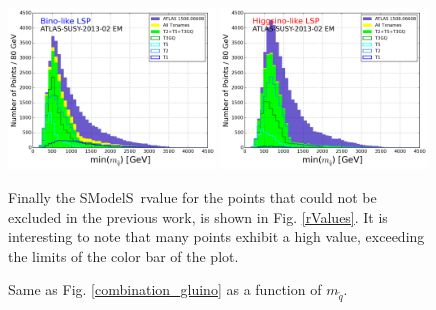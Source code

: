 \documentclass[a4paper,11pt]{article}
\newcommand{\SMO}{{\sc SModelS}}
\newcommand{\MSQ}{$ m _{ \tilde q } $\xspace}
\begin{document}
\begin{figure}[!]
\begin{center}
\includegraphics[width=0.49\textwidth]{PLOTS/BINO_Txnames_Contribution_ATLAS02_Squark.png}
\includegraphics[width=0.49\textwidth]{PLOTS/HIGGSINO_Txnames_Contribution_ATLAS02_Squark.png}
\end{center}
\caption{Same as Fig. \ref{combination_gluino} as a function of \MSQ.} 
\label{combination_squark}
%
%
Finally the \SMO~rvalue for the points that could not be excluded in the previous work, is shown in Fig. \ref{rValues}. It is interesting to note that many points exhibit a high value, exceeding the limits of the color bar of the plot. 
\end{figure}
\end{document}
